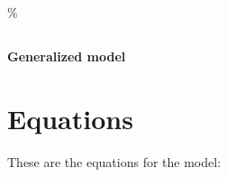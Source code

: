 \documentclass{article}%
\begin{document}
%
\%
\fontsize{18}{16}%
\selectfont%
\begin{center}%
\section*{}%
\label{sec:}%
\begin{Huge}%
\textbf{Generalized model}%
\end{Huge}

%
\end{center}%
\section{Equations}%
\label{sec:Equations}%
\begin{Large}%
These are the equations for the model:%
\end{Large}
\end{document}
